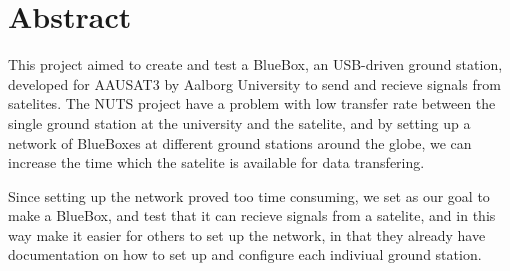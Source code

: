 \section*{Abstract}
This project aimed to create and test a BlueBox, an USB-driven ground station, developed for AAUSAT3 by Aalborg University to send and recieve signals from satelites. The NUTS project have a problem with low transfer rate between the single ground station at the university and the satelite, and by setting up a network of BlueBoxes at different ground stations around the globe, we can increase the time which the satelite is available for data transfering.

Since setting up the network proved too time consuming, we set as our goal to make a BlueBox, and test that it can recieve signals from a satelite, and in this way make it easier for others to set up the network, in that they already have documentation on how to set up and configure each indiviual ground station.